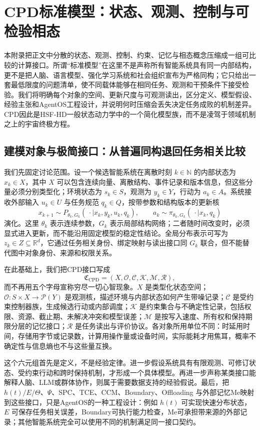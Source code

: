\chapter{CPD标准模型：状态、观测、控制与可检验相态}
\label{chp:cpd_standard_model}

本附录把正文中分散的状态、观测、控制、约束、记忆与相态概念压缩成一组可比较的计算接口。所谓“标准模型”在这里不是声称所有智能系统具有同一内部结构，更不是把人脑、语言模型、强化学习系统和社会组织宣布为严格同构；它只给出一套最低限度的问题清单，使不同载体能够在相同任务、观测和干预条件下接受检验。我们将明确每个对象的空间、更新尺度与可观测读出，区分定义、模型假设、经验主张和AgentOS工程设计，并说明何时压缩会丢失决定任务成败的机制差异。CPD因此是HSF-HD一般状态动力学中的一个简化模型族，而不是凌驾于领域机制之上的宇宙终极方程。

\section{建模对象与极简接口：从普遍同构退回任务相关比较}
\label{sec:cpd_meta_framework}

我们先固定讨论范围。设一个候选智能系统在离散时刻 $k\in\mathbb{N}$ 的内部状态为 $x_k\in X$，其中 $X$ 可以包含连续向量、离散结构、事件记录和版本信息，但这些分量必须分别类型化；环境状态为 $s_k\in S$，观测为 $y_k\in Y$，行动为 $a_k\in A$。系统接收外部输入 $u_k\in U$ 与任务规范 $q_k\in Q$，按带参数和结构版本的更新核
\[
  x_{k+1}\sim P_{\theta_k,G_k}(\,\cdot\mid x_k,y_k,u_k,q_k),
  \qquad a_k\sim\pi_{\theta_k,G_k}(\,\cdot\mid x_k,q_k)
\]
演化。这里 $\theta_k$ 表示连续参数，$G_k$ 表示局部结构网络；二者随时间改变时，必须显式进入更新，而不能沿用固定模型的稳定性结论。全局分布表示可写为 $z_k\in Z\subseteq\mathbb{R}^d$，它通过任务相关身份、绑定映射与读出接口同 $G_k$ 联合，但不能替代图中对象身份、来源和权限关系。

在此基础上，我们把CPD接口写成
\[
  \mathfrak{C}_{\mathrm{CPD}}
  =(X,\mathcal{O},\mathcal{C},\mathcal{K},\mathcal{M},\mathcal{R}),
\]
而不再用五个字母宣称穷尽一切心智现象。$X$ 是类型化状态空间；$\mathcal{O}:S\times X\to\mathcal{P}(Y)$ 是观测核，描述环境与内部状态如何产生带噪记录；$\mathcal{C}$ 是受约束控制器族，生成候选行动或内部调度；$\mathcal{K}$ 是约束集合与不确定性记录，包括权限、资源、截止期、未解决冲突和模型误差；$\mathcal{M}$ 是按写入速度、所有权和保持期限分层的记忆接口；$\mathcal{R}$ 是任务读出与评价协议。各对象所用单位不同：时延用时间，存储用字节或记录数，计算用操作量或设备时间，实际能耗才用焦耳，概率不确定性与信息熵也不与这些量互换。

这个六元组首先是定义，不是经验定律。进一步假设系统具有有限观测、可修订状态、受约束行动和跨时保持机制，才形成一个具体模型。再进一步声称某类接口能解释人脑、LLM或群体协作，则属于需要数据支持的经验假说。最后，把 $h(t)/E/\Theta$、$\Psi$、SPC、TCE、CCM、Boundary、Offloading 与外部记忆Me映射到这些接口，只是AgentOS的一种工程设计：例如 $h(t)$ 可实现快速分布状态，$E$ 可保存任务相关误差，Boundary可执行能力检查，Me可承担带来源的外部记录；其他智能系统完全可以使用不同的机制满足同一接口契约。

